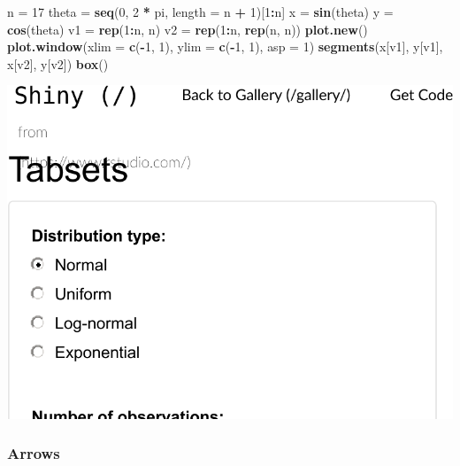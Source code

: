 \documentclass[]{book}
\newenvironment{Shaded}{\begin{snugshade}}{\end{snugshade}}
\newcommand{\DataTypeTok}[1]{\textcolor[rgb]{0.13,0.29,0.53}{#1}}
\newcommand{\DecValTok}[1]{\textcolor[rgb]{0.00,0.00,0.81}{#1}}
\newcommand{\KeywordTok}[1]{\textcolor[rgb]{0.13,0.29,0.53}{\textbf{#1}}}
\newcommand{\NormalTok}[1]{#1}
\newcommand{\OperatorTok}[1]{\textcolor[rgb]{0.81,0.36,0.00}{\textbf{#1}}}
\newcommand{\StringTok}[1]{\textcolor[rgb]{0.31,0.60,0.02}{#1}}
\theoremstyle{definition}
\theoremstyle{definition}
\theoremstyle{definition}
\theoremstyle{remark}
\begin{document}
\begin{Shaded}
\begin{Highlighting}[]
\NormalTok{n =}\StringTok{ }\DecValTok{17}
\NormalTok{theta =}\StringTok{ }\KeywordTok{seq}\NormalTok{(}\DecValTok{0}\NormalTok{, }\DecValTok{2} \OperatorTok{*}\StringTok{ }\NormalTok{pi, }\DataTypeTok{length =}\NormalTok{ n }\OperatorTok{+}\StringTok{ }\DecValTok{1}\NormalTok{)[}\DecValTok{1}\OperatorTok{:}\NormalTok{n]}
\NormalTok{x =}\StringTok{ }\KeywordTok{sin}\NormalTok{(theta)}
\NormalTok{y =}\StringTok{ }\KeywordTok{cos}\NormalTok{(theta)}
\NormalTok{v1 =}\StringTok{ }\KeywordTok{rep}\NormalTok{(}\DecValTok{1}\OperatorTok{:}\NormalTok{n, n)}
\NormalTok{v2 =}\StringTok{ }\KeywordTok{rep}\NormalTok{(}\DecValTok{1}\OperatorTok{:}\NormalTok{n, }\KeywordTok{rep}\NormalTok{(n, n))}
\KeywordTok{plot.new}\NormalTok{()}
\KeywordTok{plot.window}\NormalTok{(}\DataTypeTok{xlim =} \KeywordTok{c}\NormalTok{(}\OperatorTok{-}\DecValTok{1}\NormalTok{, }\DecValTok{1}\NormalTok{), }\DataTypeTok{ylim =} \KeywordTok{c}\NormalTok{(}\OperatorTok{-}\DecValTok{1}\NormalTok{, }\DecValTok{1}\NormalTok{), }\DataTypeTok{asp =} \DecValTok{1}\NormalTok{)}
\KeywordTok{segments}\NormalTok{(x[v1], y[v1], x[v2], y[v2])}
\KeywordTok{box}\NormalTok{()}
\end{Highlighting}
\end{Shaded}

\includegraphics[width=0.5\linewidth]{Rcourse_files/figure-latex/unnamed-chunk-266-1}

\hypertarget{arrows}{%
\subsubsection{Arrows}\label{arrows}}
\end{document}

